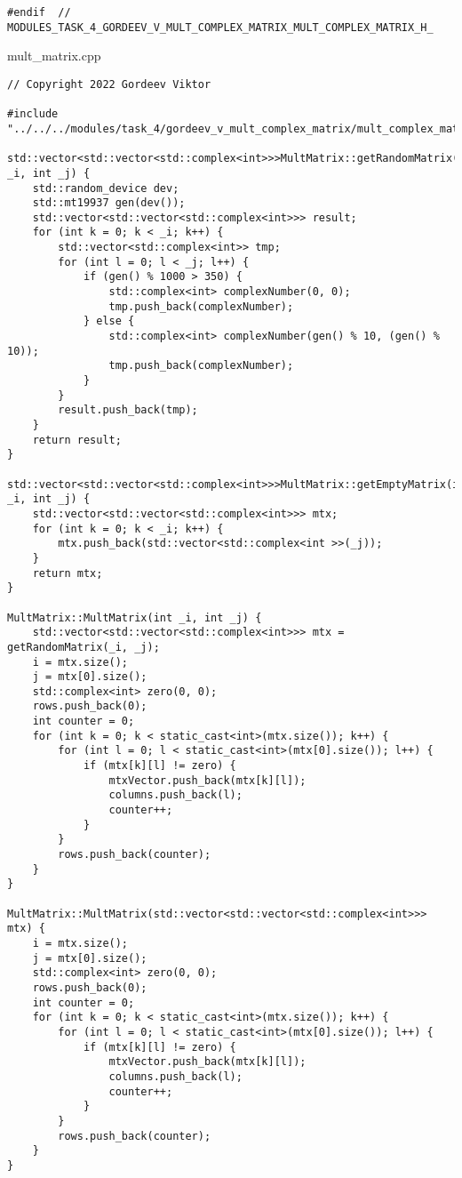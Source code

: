 \documentclass{report}
\begin{document}
\begin{enumerate}
\begin{lstlisting}
#endif  // MODULES_TASK_4_GORDEEV_V_MULT_COMPLEX_MATRIX_MULT_COMPLEX_MATRIX_H_

\end{lstlisting}
mult_matrix.cpp
\begin{lstlisting}
// Copyright 2022 Gordeev Viktor

#include "../../../modules/task_4/gordeev_v_mult_complex_matrix/mult_complex_matrix.h"

std::vector<std::vector<std::complex<int>>>MultMatrix::getRandomMatrix(int _i, int _j) {
    std::random_device dev;
    std::mt19937 gen(dev());
    std::vector<std::vector<std::complex<int>>> result;
    for (int k = 0; k < _i; k++) {
        std::vector<std::complex<int>> tmp;
        for (int l = 0; l < _j; l++) {
            if (gen() % 1000 > 350) {
                std::complex<int> complexNumber(0, 0);
                tmp.push_back(complexNumber);
            } else {
                std::complex<int> complexNumber(gen() % 10, (gen() % 10));
                tmp.push_back(complexNumber);
            }
        }
        result.push_back(tmp);
    }
    return result;
}

std::vector<std::vector<std::complex<int>>>MultMatrix::getEmptyMatrix(int _i, int _j) {
    std::vector<std::vector<std::complex<int>>> mtx;
    for (int k = 0; k < _i; k++) {
        mtx.push_back(std::vector<std::complex<int >>(_j));
    }
    return mtx;
}

MultMatrix::MultMatrix(int _i, int _j) {
    std::vector<std::vector<std::complex<int>>> mtx = getRandomMatrix(_i, _j);
    i = mtx.size();
    j = mtx[0].size();
    std::complex<int> zero(0, 0);
    rows.push_back(0);
    int counter = 0;
    for (int k = 0; k < static_cast<int>(mtx.size()); k++) {
        for (int l = 0; l < static_cast<int>(mtx[0].size()); l++) {
            if (mtx[k][l] != zero) {
                mtxVector.push_back(mtx[k][l]);
                columns.push_back(l);
                counter++;
            }
        }
        rows.push_back(counter);
    }
}

MultMatrix::MultMatrix(std::vector<std::vector<std::complex<int>>> mtx) {
    i = mtx.size();
    j = mtx[0].size();
    std::complex<int> zero(0, 0);
    rows.push_back(0);
    int counter = 0;
    for (int k = 0; k < static_cast<int>(mtx.size()); k++) {
        for (int l = 0; l < static_cast<int>(mtx[0].size()); l++) {
            if (mtx[k][l] != zero) {
                mtxVector.push_back(mtx[k][l]);
                columns.push_back(l);
                counter++;
            }
        }
        rows.push_back(counter);
    }
}


\end{lstlisting}
\end{enumerate}
\end{document}
